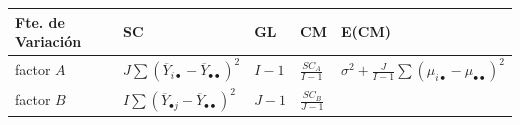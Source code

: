 \documentclass[]{book}
\theoremstyle{definition}
\theoremstyle{definition}
\theoremstyle{definition}
\theoremstyle{remark}
\begin{document}
\begin{longtable}[]{@{}lllll@{}}
\toprule
\begin{minipage}[b]{0.04\columnwidth}\raggedright
Fte. de Variación\strut
\end{minipage} & \begin{minipage}[b]{0.40\columnwidth}\raggedright
SC\strut
\end{minipage} & \begin{minipage}[b]{0.03\columnwidth}\raggedright
GL\strut
\end{minipage} & \begin{minipage}[b]{0.15\columnwidth}\raggedright
CM\strut
\end{minipage} & \begin{minipage}[b]{0.22\columnwidth}\raggedright
E(CM)\strut
\end{minipage}\tabularnewline
\midrule
\endhead
\begin{minipage}[t]{0.04\columnwidth}\raggedright
factor \(A\)\strut
\end{minipage} & \begin{minipage}[t]{0.40\columnwidth}\raggedright
\(J\sum\left( \overline{Y}_{i \bullet} - \overline{Y}_{\bullet \bullet} \right)^{2}\)\strut
\end{minipage} & \begin{minipage}[t]{0.03\columnwidth}\raggedright
\(I - 1\)\strut
\end{minipage} & \begin{minipage}[t]{0.15\columnwidth}\raggedright
\(\frac{SC_{A}}{I - 1}\)\strut
\end{minipage} & \begin{minipage}[t]{0.22\columnwidth}\raggedright
\(\sigma^{2} + \frac{J}{I - 1}\sum\left( \mu_{i \bullet} - \mu_{\bullet \bullet} \right)^{2}\)\strut
\end{minipage}\tabularnewline
\begin{minipage}[t]{0.04\columnwidth}\raggedright
factor \(B\)\strut
\end{minipage} & \begin{minipage}[t]{0.40\columnwidth}\raggedright
\(I\sum\left( \overline{Y}_{\bullet j} - \overline{Y}_{\bullet \bullet} \right)^{2}\)\strut
\end{minipage} & \begin{minipage}[t]{0.03\columnwidth}\raggedright
\(J - 1\)\strut
\end{minipage} & \begin{minipage}[t]{0.15\columnwidth}\raggedright
\(\frac{SC_{B}}{J - 1}\)\strut

\end{minipage}
\end{longtable}
\end{document}
